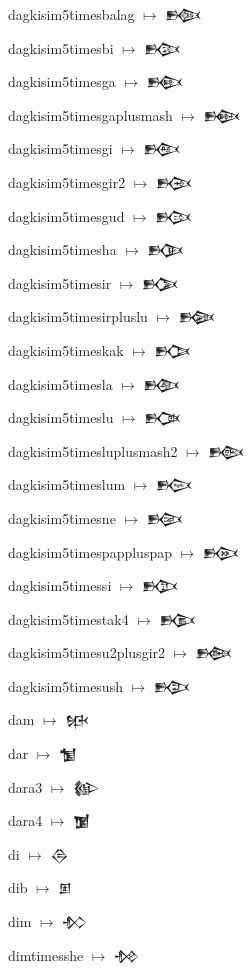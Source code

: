 {\noindent dagkisim5timesbalag $\mapsto$ {\cufont 𒁙}\par
\noindent dagkisim5timesbi $\mapsto$ {\cufont 𒁚}\par
\noindent dagkisim5timesga $\mapsto$ {\cufont 𒁛}\par
\noindent dagkisim5timesgaplusmash $\mapsto$ {\cufont 𒁜}\par
\noindent dagkisim5timesgi $\mapsto$ {\cufont 𒁝}\par
\noindent dagkisim5timesgir2 $\mapsto$ {\cufont 𒁞}\par
\noindent dagkisim5timesgud $\mapsto$ {\cufont 𒁟}\par
\noindent dagkisim5timesha $\mapsto$ {\cufont 𒁠}\par
\noindent dagkisim5timesir $\mapsto$ {\cufont 𒁡}\par
\noindent dagkisim5timesirpluslu $\mapsto$ {\cufont 𒁢}\par
\noindent dagkisim5timeskak $\mapsto$ {\cufont 𒁣}\par
\noindent dagkisim5timesla $\mapsto$ {\cufont 𒁤}\par
\noindent dagkisim5timeslu $\mapsto$ {\cufont 𒁥}\par
\noindent dagkisim5timesluplusmash2 $\mapsto$ {\cufont 𒁦}\par
\noindent dagkisim5timeslum $\mapsto$ {\cufont 𒁧}\par
\noindent dagkisim5timesne $\mapsto$ {\cufont 𒁨}\par
\noindent dagkisim5timespappluspap $\mapsto$ {\cufont 𒁩}\par
\noindent dagkisim5timessi $\mapsto$ {\cufont 𒁪}\par
\noindent dagkisim5timestak4 $\mapsto$ {\cufont 𒁫}\par
\noindent dagkisim5timesu2plusgir2 $\mapsto$ {\cufont 𒁬}\par
\noindent dagkisim5timesush $\mapsto$ {\cufont 𒁭}\par
\noindent dam $\mapsto$ {\cufont 𒁮}\par
\noindent dar $\mapsto$ {\cufont 𒁯}\par
\noindent dara3 $\mapsto$ {\cufont 𒁰}\par
\noindent dara4 $\mapsto$ {\cufont 𒁱}\par
\noindent di $\mapsto$ {\cufont 𒁲}\par
\noindent dib $\mapsto$ {\cufont 𒁳}\par
\noindent dim $\mapsto$ {\cufont 𒁴}\par
\noindent dimtimesshe $\mapsto$ {\cufont 𒁵}\par
}
